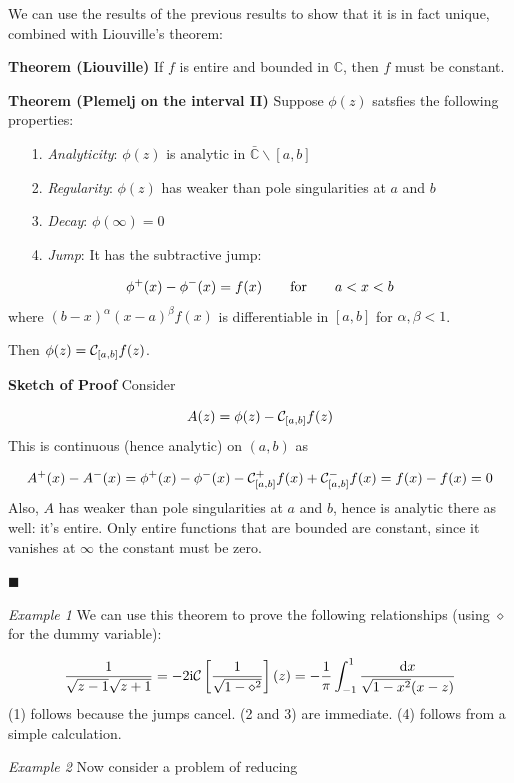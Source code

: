 \documentclass[12pt,a4paper]{article}
\def\qqfor{\qquad\hbox{for}\qquad}
\def\D{ {\rm d} }
\def\I{ {\rm i} }
\def\C{ {\mathbb C} }
\def\dx{\D x}
\begin{document}
We can use the results of the previous results to show that it is in fact unique, combined with Liouville's theorem:

\textbf{Theorem (Liouville)} If $f$ is entire and  bounded in ${\mathbb C}$, then $f$ must be constant.

\textbf{Theorem (Plemelj on the interval II)} Suppose $\phi(z)$ satsfies the following properties:

\begin{itemize}
\item[1. ] \emph{Analyticity}: $\phi(z)$ is analytic in $\bar \C \backslash [a,b]$


\item[2. ] \emph{Regularity}: $\phi(z)$ has weaker than pole singularities at $a$ and $b$


\item[3. ] \emph{Decay}: $\phi(\infty) = 0$


\item[4. ] \emph{Jump}: It has the subtractive jump:

\end{itemize}
\[
\phi^+(x) - \phi^-(x) = f(x) \qqfor a < x < b
\]
where $(b-x)^\alpha (x-a)^\beta f(x)$ is differentiable in $[a,b]$ for $\alpha,\beta < 1$.  

Then $\phi(z) = {\cal C}_{[a,b]} f(z)$.

\textbf{Sketch of Proof} Consider 

\[
A(z) = \phi(z) - {\cal C}_{[a,b]} f(z)
\]
This is continuous (hence analytic) on $(a,b)$ as

\[
A^+(x) - A^-(x) = \phi^+(x) -\phi^-(x) - {\cal C}_{[a,b]}^+ f(x) + {\cal C}_{[a,b]}^- f(x)  =f(x) - f(x) = 0
\]
Also, $A$ has weaker than pole singularities at $a$ and $b$, hence is analytic there as well: it's entire.  Only entire functions that are bounded are constant, since it vanishes at $\infty$ the constant must be zero.

\ensuremath{\blacksquare}

\emph{Example 1} We can use this theorem to prove the following relationships  (using $\diamond$ for the dummy variable):

\[
{1 \over \sqrt{z-1} \sqrt{z+1}} = -2 \I {\cal C}\left[{1 \over \sqrt{1-\diamond^2}}\right](z) = 
-{1 \over \pi}\int_{-1}^1 {\dx \over \sqrt{1-x^2} (x-z)}
\]
(1) follows because the jumps cancel. (2 and 3) are immediate. (4) follows from a simple calculation. 

\emph{Example 2} Now consider a problem of reducing 
\end{document}
